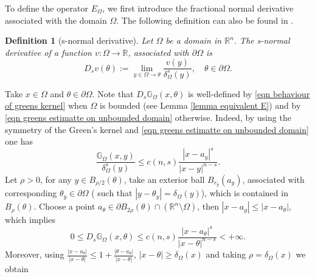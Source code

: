 \documentclass{amsart}
\newcommand{\cm}{\color{magenta}}
\newcommand{\nc}{\normalcolor}
\newtheorem{definition}[theorem]{Definition}
\newcommand{\R}{\mathbb{R}}
\newcommand{\rn}{\mathbb{R}^{n}}
\newcommand{\gk}[1]{\mathbb{G}_{#1}}
\newcommand{\Ds}{D_{s}}
\begin{document}
To define the operator $E_{\Omega}$, we first introduce the fractional normal derivative associated with the domain $\Omega$. The following definition can also be found in \cite{AbatangeloVazquez2023}.
\begin{definition}[s-normal derivative]\label{frac normal derivative}
    Let $\Omega$ be a domain in $\rn$. The \textit{s-normal derivative}  of a function $v:\Omega\to\R$, associated  with $\partial \Omega$ is 
    \begin{equation*}
        D_{s}v(\theta):=\lim_{y\in \Omega\to \theta}\frac{v(y)}{\delta^{s}_{\Omega}(y)},\quad \theta\in \partial\Omega.
    \end{equation*}
\end{definition}
Take $x\in \Omega$ and $\theta \in \partial \Omega$. Note that $ D_s \gk{\Omega}(x,\theta)$ is well-defined by \eqref{eqn behaviour of greens kernel} when $\Omega$ is bounded (see Lemma \ref{lemma equivalent E}) and by \eqref{eqn greens estimatte on unbounded domain} otherwise. Indeed, by using the symmetry of the Green's kernel and \eqref{eqn greens estimatte on unbounded domain} one has 
\begin{equation}\label{eqn fractional normal derivative behaviour}
     \frac{\gk{\Omega}(x,y)}{\delta_{\Omega}^{s}(y)}\leq c(n,s)\frac{|x-a_y|^{s}}{|x-y|^{n-s}}.
\end{equation}
Let $\rho>0$, for any $y\in B_{\rho/2}(\theta)$, take an exterior ball $B_{r_y} (a_y)$, associated with corresponding $\theta_y \in \partial\Omega$ ( such that $|y-\theta_y|=\delta_{\Omega}(y)$), which is contained in $B_{\rho}(\theta)$. Choose a point $a_{\theta}\in  \partial B_{2\rho}(\theta)\cap (\R^{n}\setminus\Omega)$, then $|x-a_y|\leq |x-a_{\theta}|$, which implies 
\begin{equation}\label{eqn well definedness of frac normal derivative on unbounded domain}
    0\leq \Ds \gk{\Omega}(x,\theta)\leq c(n,s)\frac{|x-a_{\theta}|^{s}}{|x-\theta|^{n-s}}< +\infty.
\end{equation}
Moreover, using $\frac{|x-a_{\theta}|}{|x-\theta|}\leq 1+\frac{|\theta-a_{\theta}|}{|x-\theta|}$, $|x-\theta|\geq \delta_{\Omega}(x)$ and taking $\rho = \delta_{\Omega}(x)$ we obtain 
\end{document}

